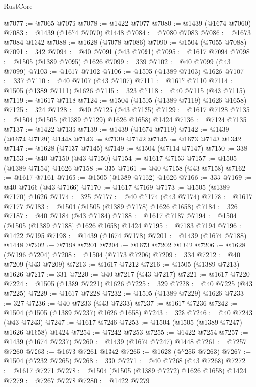 \begin{lexlean}{RustCore}
\begin{coremodule}
@7077 := @7065 @7076
@7078 := @1422 @7077
@7080 := @1439 (@1674 @7060)
@7083 := @1439 (@1674 @7070) @1448
@7084 := @7080 @7083
@7086 := @1673 @7084 @1342
@7088 := @1628 (@7078 @7086)
@7090 := @1504 (@7055 @7088)
@7091 := 342
@7094 := @40 @7091 (@43 @7091)
@7095 := @1617 @7094
@7098 := @1505 (@1389 @7095) @1626
@7099 := 339
@7102 := @40 @7099 (@43 @7099)
@7103 := @1617 @7102
@7106 := @1505 (@1389 @7103) @1626
@7107 := 337
@7110 := @40 @7107 (@43 @7107)
@7111 := @1617 @7110
@7114 := @1505 (@1389 @7111) @1626
@7115 := 323
@7118 := @40 @7115 (@43 @7115)
@7119 := @1617 @7118
@7124 := @1504 (@1505 (@1389 @7119) @1626 @1658)
@7125 := 324
@7128 := @40 @7125 (@43 @7125)
@7129 := @1617 @7128
@7135 := @1504 (@1505 (@1389 @7129) @1626 @1658) @1424
@7136 := @7124 @7135
@7137 := @1422 @7136
@7139 := @1439 (@1674 @7119)
@7142 := @1439 (@1674 @7129) @1448
@7143 := @7139 @7142
@7145 := @1673 @7143 @1342
@7147 := @1628 (@7137 @7145)
@7149 := @1504 (@7114 @7147)
@7150 := 338
@7153 := @40 @7150 (@43 @7150)
@7154 := @1617 @7153
@7157 := @1505 (@1389 @7154) @1626
@7158 := 335
@7161 := @40 @7158 (@43 @7158)
@7162 := @1617 @7161
@7165 := @1505 (@1389 @7162) @1626
@7166 := 333
@7169 := @40 @7166 (@43 @7166)
@7170 := @1617 @7169
@7173 := @1505 (@1389 @7170) @1626
@7174 := 325
@7177 := @40 @7174 (@43 @7174)
@7178 := @1617 @7177
@7183 := @1504 (@1505 (@1389 @7178) @1626 @1658)
@7184 := 326
@7187 := @40 @7184 (@43 @7184)
@7188 := @1617 @7187
@7194 := @1504 (@1505 (@1389 @7188) @1626 @1658) @1424
@7195 := @7183 @7194
@7196 := @1422 @7195
@7198 := @1439 (@1674 @7178)
@7201 := @1439 (@1674 @7188) @1448
@7202 := @7198 @7201
@7204 := @1673 @7202 @1342
@7206 := @1628 (@7196 @7204)
@7208 := @1504 (@7173 @7206)
@7209 := 334
@7212 := @40 @7209 (@43 @7209)
@7213 := @1617 @7212
@7216 := @1505 (@1389 @7213) @1626
@7217 := 331
@7220 := @40 @7217 (@43 @7217)
@7221 := @1617 @7220
@7224 := @1505 (@1389 @7221) @1626
@7225 := 329
@7228 := @40 @7225 (@43 @7225)
@7229 := @1617 @7228
@7232 := @1505 (@1389 @7229) @1626
@7233 := 327
@7236 := @40 @7233 (@43 @7233)
@7237 := @1617 @7236
@7242 := @1504 (@1505 (@1389 @7237) @1626 @1658)
@7243 := 328
@7246 := @40 @7243 (@43 @7243)
@7247 := @1617 @7246
@7253 := @1504 (@1505 (@1389 @7247) @1626 @1658) @1424
@7254 := @7242 @7253
@7255 := @1422 @7254
@7257 := @1439 (@1674 @7237)
@7260 := @1439 (@1674 @7247) @1448
@7261 := @7257 @7260
@7263 := @1673 @7261 @1342
@7265 := @1628 (@7255 @7263)
@7267 := @1504 (@7232 @7265)
@7268 := 330
@7271 := @40 @7268 (@43 @7268)
@7272 := @1617 @7271
@7278 := @1504 (@1505 (@1389 @7272) @1626 @1658) @1424
@7279 := @7267 @7278
@7280 := @1422 @7279

\end{coremodule}
\end{lexlean}
